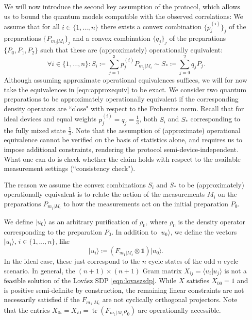 We will now introduce the second key assumption of the protocol, which allows us to bound the quantum models compatible with the observed correlations: We assume that for all $i\in\{1,\dots,n\}$ there exists a convex combination $\{p_j^{(i)}\}_j$ of the preparations $\{P_{m_j\vert M_i}\}_j$ and a convex combination $\{q_j\}_j$ of the preparations $\{P_0,P_1,P_2\}$ such that these are (approximately) operationally equivalent:
\begin{equation}
\label{eqn:approxequiv}
\forall i\in\{1,\dots,n\}: S_i \coloneqq \sum_{j=1}^3 p_j^{(i)}P_{m_j\vert M_i} \sim S_* \coloneqq \sum_{j=0}^2 q_j P_j.
\end{equation}
Although assuming approximate operational equivalences suffices, we will for now take the equivalences in \ref{eqn:approxequiv} to be exact. We consider two quantum preparations to be approximately operationally equivalent if the corresponding density operators are ``close" with respect to the Frobenius norm. Recall that for ideal devices and equal weights $p_j^{(i)}=q_j=\frac{1}{3}$, both $S_i$ and $S_{*}$ corresponding to the fully mixed state $\frac{\mathbb{1}}{3}$. Note that the assumption of (approximate) operational equivalence cannot be verified on the basis of statistics alone, and requires us to impose additional constraints, rendering the protocol semi-device-independent. What one can do is check whether the claim holds with respect to the available measurement settings (``consistency check").  

The reason we assume the convex combinations $S_i$ and $S_{*}$ to be (approximately) operationally equivalent is to relate the action of the measurements $M_i$ on the preparations $P_{m_j\vert M_i}$ to how the measurements act on the initial preparation $P_0$.

We define $\vert u_0 \rangle$ as an arbitrary purification of $\rho_0$, where $\rho_0$ is the density operator corresponding to the preparation $P_0$. In addition to $\vert u_0 \rangle$, we define the vectors $\vert u_i \rangle$, $i \in \{1,\dots,n\}$, like
\begin{equation}
\label{eqn:gramvectors}
\vert u_i \rangle \coloneqq (F_{m_1\vert M_i}\otimes\mathbb{1})\vert u_0 \rangle.
\end{equation}
In the ideal case, these just correspond to the $n$ cycle states of the odd $n$-cycle scenario. In general, the $(n+1)\times(n+1)$ Gram matrix $X_{ij}=\langle u_i \vert u_j \rangle$ is not a feasible solution of the Lovász SDP \ref{eqn:lovaszsdp}. While $X$ satisfies $X_{00}=1$ and is positive semi-definite by construction, the remaining linear constraints are not necessarily satisfied if the $F_{m_1\vert M_i}$ are not cyclically orthogonal projectors. Note that the entries $X_{0i}=X_{i0}=\operatorname{tr}(F_{m_1\vert M_i} \rho_0)$ are operationally accessible. 

